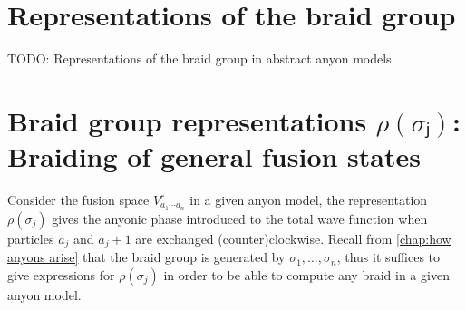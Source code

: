 \documentclass[a4paper,10pt,oneside]{book}
\theoremstyle{plain}
\theoremstyle{definition}
\theoremstyle{remark}
\begin{document}
\clearpage






























\section{Representations of the braid group}\label{sec:anyonic braid representations}

TODO: Representations of the braid group in abstract anyon models.

































\section{Braid group representations $ρ(σⱼ)$: Braiding of general fusion states}\label{sec:general braiding}

Consider the fusion space $V_{a_1 \cdots a_n}^c$ in a given anyon model, the representation $ρ(σ_j)$ gives the anyonic phase introduced to the total wave function when particles $a_j$ and $a_j+1$ are exchanged (counter)clockwise. Recall from \cref{chap:how anyons arise} that the braid group is generated by $σ_1, \ldots, σ_n$, thus it suffices to give expressions for $ρ(σ_j)$ in order to be able to compute any braid in a given anyon model.
\end{document}
